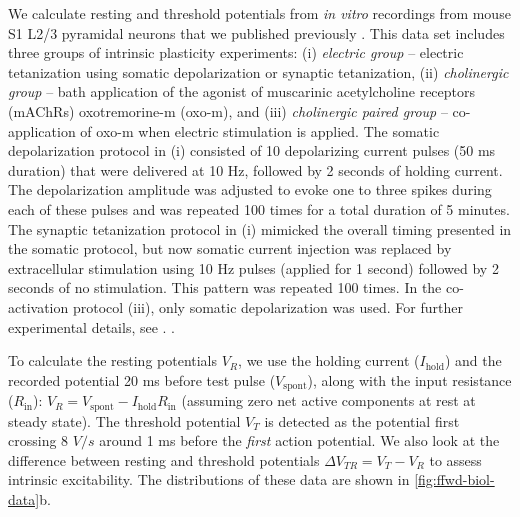 We calculate resting and threshold potentials from \textit{in vitro} recordings
        from mouse S1 L2/3 pyramidal neurons that we published previously \citep{Gill2020-wy}.
    This data set includes three groups of intrinsic plasticity experiments:
        (i) \textit{electric group} -- electric tetanization using somatic depolarization or synaptic tetanization,
        (ii) \textit{cholinergic group} -- bath application of the agonist of muscarinic acetylcholine receptors (mAChRs) oxotremorine-m (oxo-m),
        and (iii) \textit{cholinergic paired group} -- co-application of oxo-m when electric stimulation is applied.
    The somatic depolarization protocol in (i) consisted of
        10 depolarizing current pulses (50 ms duration) that
        were delivered at 10 Hz, followed by 2 seconds of holding current.
    The depolarization amplitude was adjusted to evoke one to three spikes during each of these pulses
        and was repeated 100 times for a total duration of 5 minutes.
    The synaptic tetanization protocol in (i) mimicked the overall timing presented in the somatic protocol,
        but now somatic current injection was replaced by
            extracellular stimulation using 10 Hz pulses (applied for 1 second)
            followed by 2 seconds of no stimulation.
    This pattern was repeated 100 times.
    In the co-activation protocol (iii), only somatic depolarization was used.
    For further experimental details, see \cite{Gill2020-wy}.
     .

To calculate the resting potentials $V_R$, we use
        the holding current ($I_{\mathrm{hold}}$)
        and the recorded potential 20 ms before test pulse ($V_{\mathrm{spont}}$),
        along with the input resistance ($R_{\mathrm{in}}$):
            $V_R = V_{\mathrm{spont}} - I_{\mathrm{hold}} R_{\mathrm{in}}$
            (assuming zero net active components at rest at steady state).
    The threshold potential $V_T$ is detected
        as the potential first crossing 8 $V/s$
        \citep[for a similar approach, see][]{Mahon2012-bt, Popescu2021-cj}
        around 1 ms before the \textit{first} action potential.
    We also look at the difference between resting and threshold potentials
        $\Delta V_{TR} = V_T - V_R$ to assess intrinsic excitability.
    The distributions of these data are shown in \autoref{fig:ffwd-biol-data}b.

